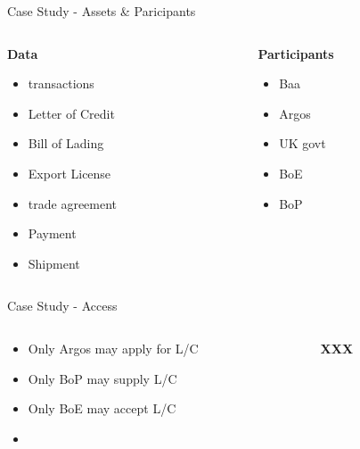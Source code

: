 \documentclass[pdf,table]{beamer}
\begin{document}
\begin{frame}{Case Study - Assets \& Paricipants}
	\begin{columns}[T]
		\begin{column}{0.48\textwidth}
			{\bf Data}
			\begin{itemize}
				\item transactions
				\item Letter of Credit
				\item Bill of Lading
				\item Export License
				\item trade agreement
				\item Payment
				\item Shipment
			\end{itemize}
		\end{column}
		\begin{column}{0.48\textwidth}
			{\bf Participants}
			\begin{itemize}
				\item Baa
				\item Argos
				\item UK govt
				\item BoE
				\item BoP
			\end{itemize}
		\end{column}
	\end{columns}	
\end{frame}

\begin{frame}{Case Study - Access}
	\begin{columns}[T]
		\begin{column}{0.48\textwidth}
			\begin{itemize}
				\item Only Argos may apply for L/C
				\item Only BoP may supply L/C
				\item Only BoE may accept L/C
				\item 
			\end{itemize}
		\end{column}
		\begin{column}{0.48\textwidth}
			{\bf XXX}
		\end{column}
	\end{columns}	
\end{frame}
\end{document}
